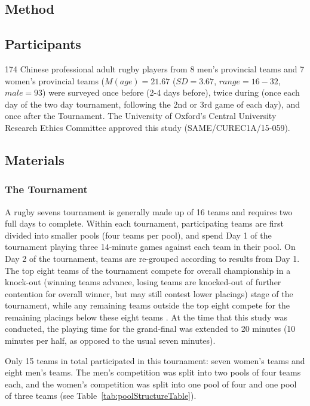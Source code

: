\begin{CJK}{UTF8}{gbsn}
\clearpage

\section{Method}
\subsection{Participants}
174 Chinese professional adult rugby players from 8 men’s provincial teams and 7 women’s provincial teams ($M(age) = 21.67$ ($SD = 3.67$, $range = 16 - 32$, $male = 93$) were surveyed once before (2-4 days before), twice during (once each day of the two day tournament, following the 2nd or 3rd game of each day), and once after the Tournament.  The University of Oxford’s Central University Research Ethics Committee approved this study (SAME/CUREC1A/15-059).

\subsection{Materials}

\subsubsection{The Tournament}
A rugby sevens tournament is generally made up of 16 teams and requires two full days to complete.  Within each tournament, participating teams are first divided into smaller pools (four teams per pool), and spend Day 1 of the tournament playing three 14-minute games against each team in their pool. On Day 2 of the tournament, teams are re-grouped according to results from Day 1.  The top eight teams of the tournament compete for overall championship in a knock-out (winning teams advance, losing teams are knocked-out of further contention for overall winner, but may still contest lower placings) stage of the tournament, while any remaining teams outside the top eight compete for the remaining placings below these eight teams \citep[][]{WorldRugby2018}. At the time that this study was conducted, the playing time for the grand-final was extended to 20 minutes (10 minutes per half, as opposed to the usual seven minutes).

Only 15 teams in total participated in this tournament: seven women's teams and eight men's teams. The men’s competition was split into two pools of four teams each, and the women’s competition was split into one pool of four and one pool of three teams (see Table~\ref{tab:poolStructureTable}).


\end{CJK}
